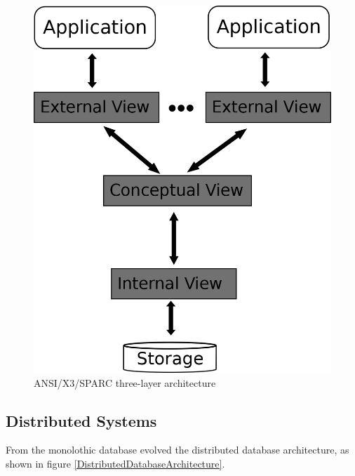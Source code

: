 \begin{figure}[H]
	\begin{center}
		\includegraphics[scale=0.5]{figures/monolithicalDatabaseArchitecture.png}
	\end{center}
	\caption{ANSI/X3/SPARC three-layer architecture \cite[p. 85]{DBLP:books/dp/LeserN2006}}
	\label{MonolithicDatabaseArchitecture}
\end{figure} 


\subsection{Distributed Systems}

From the monolothic database evolved the distributed database architecture, as shown in figure \ref{DistributedDatabaseArchitecture}.

